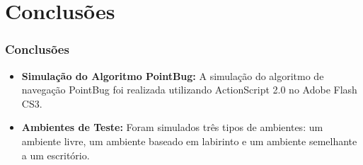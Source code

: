 \documentclass[xcolor=dvipsnames, aspectratio=169]{beamer}
\begin{document}
\section{Conclusões}
\begin{frame}
  \frametitle{Conclusões}
  \begin{itemize}
    \item \textbf{Simulação do Algoritmo PointBug:} A simulação do algoritmo de navegação PointBug foi realizada utilizando ActionScript 2.0 no Adobe Flash CS3.
    \item \textbf{Ambientes de Teste:} Foram simulados três tipos de ambientes: um ambiente livre, um ambiente baseado em labirinto e um ambiente semelhante a um escritório.
  \end{itemize}
\end{frame}

\begin{frame}
    \printbibliography
\end{frame}


\begin{frame}
\titlepage %
\end{frame}
\end{document}
